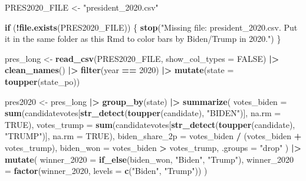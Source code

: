 \documentclass[
  11pt,
]{article}
\newenvironment{Shaded}{\begin{snugshade}}{\end{snugshade}}
\newcommand{\AttributeTok}[1]{\textcolor[rgb]{0.13,0.29,0.53}{#1}}
\newcommand{\ConstantTok}[1]{\textcolor[rgb]{0.56,0.35,0.01}{#1}}
\newcommand{\ControlFlowTok}[1]{\textcolor[rgb]{0.13,0.29,0.53}{\textbf{#1}}}
\newcommand{\DecValTok}[1]{\textcolor[rgb]{0.00,0.00,0.81}{#1}}
\newcommand{\FunctionTok}[1]{\textcolor[rgb]{0.13,0.29,0.53}{\textbf{#1}}}
\newcommand{\NormalTok}[1]{#1}
\newcommand{\OtherTok}[1]{\textcolor[rgb]{0.56,0.35,0.01}{#1}}
\newcommand{\SpecialCharTok}[1]{\textcolor[rgb]{0.81,0.36,0.00}{\textbf{#1}}}
\newcommand{\StringTok}[1]{\textcolor[rgb]{0.31,0.60,0.02}{#1}}
\begin{document}
\begin{Shaded}
\begin{Highlighting}[]
\NormalTok{PRES2020\_FILE }\OtherTok{\textless{}{-}} \StringTok{"president\_2020.csv"}

\ControlFlowTok{if}\NormalTok{ (}\SpecialCharTok{!}\FunctionTok{file.exists}\NormalTok{(PRES2020\_FILE)) \{}
  \FunctionTok{stop}\NormalTok{(}\StringTok{"Missing file: president\_2020.csv. Put it in the same folder as this Rmd to color bars by Biden/Trump in 2020."}\NormalTok{)}
\NormalTok{\}}

\NormalTok{pres\_long }\OtherTok{\textless{}{-}} \FunctionTok{read\_csv}\NormalTok{(PRES2020\_FILE, }\AttributeTok{show\_col\_types =} \ConstantTok{FALSE}\NormalTok{) }\SpecialCharTok{|\textgreater{}}
  \FunctionTok{clean\_names}\NormalTok{() }\SpecialCharTok{|\textgreater{}}
  \FunctionTok{filter}\NormalTok{(year }\SpecialCharTok{==} \DecValTok{2020}\NormalTok{) }\SpecialCharTok{|\textgreater{}}
  \FunctionTok{mutate}\NormalTok{(}\AttributeTok{state =} \FunctionTok{toupper}\NormalTok{(state\_po))}

\NormalTok{pres2020 }\OtherTok{\textless{}{-}}\NormalTok{ pres\_long }\SpecialCharTok{|\textgreater{}}
  \FunctionTok{group\_by}\NormalTok{(state) }\SpecialCharTok{|\textgreater{}}
  \FunctionTok{summarize}\NormalTok{(}
    \AttributeTok{votes\_biden =} \FunctionTok{sum}\NormalTok{(candidatevotes[}\FunctionTok{str\_detect}\NormalTok{(}\FunctionTok{toupper}\NormalTok{(candidate), }\StringTok{"BIDEN"}\NormalTok{)], }\AttributeTok{na.rm =} \ConstantTok{TRUE}\NormalTok{),}
    \AttributeTok{votes\_trump =} \FunctionTok{sum}\NormalTok{(candidatevotes[}\FunctionTok{str\_detect}\NormalTok{(}\FunctionTok{toupper}\NormalTok{(candidate), }\StringTok{"TRUMP"}\NormalTok{)], }\AttributeTok{na.rm =} \ConstantTok{TRUE}\NormalTok{),}
    \AttributeTok{biden\_share\_2p =}\NormalTok{ votes\_biden }\SpecialCharTok{/}\NormalTok{ (votes\_biden }\SpecialCharTok{+}\NormalTok{ votes\_trump),}
    \AttributeTok{biden\_won =}\NormalTok{ votes\_biden }\SpecialCharTok{\textgreater{}}\NormalTok{ votes\_trump,}
    \AttributeTok{.groups =} \StringTok{"drop"}
\NormalTok{  ) }\SpecialCharTok{|\textgreater{}}
  \FunctionTok{mutate}\NormalTok{(}
    \AttributeTok{winner\_2020 =} \FunctionTok{if\_else}\NormalTok{(biden\_won, }\StringTok{"Biden"}\NormalTok{, }\StringTok{"Trump"}\NormalTok{),}
    \AttributeTok{winner\_2020 =} \FunctionTok{factor}\NormalTok{(winner\_2020, }\AttributeTok{levels =} \FunctionTok{c}\NormalTok{(}\StringTok{"Biden"}\NormalTok{, }\StringTok{"Trump"}\NormalTok{))}
\NormalTok{  )}
\end{Highlighting}
\end{Shaded}
\end{document}
